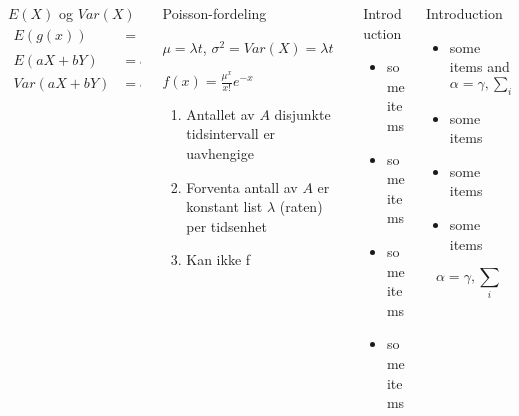 \documentclass[final,hyperref={pdfpagelabels=false}]{beamer}
\begin{document}
\begin{frame}{}
\begin{columns}[t]
\begin{column}{.25\linewidth}
\begin{block}{\normalsize $E(X)$ og $Var(X)$}
{\begin{equation*}
\begin{aligned}
						E(g(x))&=\int_{-\infty}^\infty g(X)f(x)\,dx \\
						E(aX+bY)&=aE(X)+bE(Y) \\
						Var(aX+bY)&=a^2Var(X)+b^2Var(Y)
					\end{aligned}
				\end{equation*}
			}
        \end{block}
      \end{column}
	  \begin{column}{.25\linewidth}
		  \begin{block}{\normalsize Poisson-fordeling}
			  {\footnotesize
				$\mu = \lambda t$, $\sigma^2=Var(X)=\lambda t$\par
				$f(x)=\frac{\mu^x}{x!}e^{-x}$\par
				\begin{enumerate}
					\item Antallet av $A$ disjunkte tidsintervall er uavhengige
					\item Forventa antall av $A$ er konstant list $\lambda$ (raten) per tidsenhet
					\item Kan ikke f
				\end{enumerate}
			  }
		\end{block}
      \end{column}
	  \begin{column}{.25\linewidth}
		  \begin{block}{Introduction}
          \begin{itemize}
          \item some items
          \item some items
          \item some items
          \item some items
          \end{itemize}
        \end{block}
      \end{column}
	  \begin{column}{.25\linewidth}
        \begin{block}{Introduction}
          \begin{itemize}
          \item some items and $\alpha=\gamma, \sum_{i}$
          \item some items
          \item some items
          \item some items
          \end{itemize}
          $$\alpha=\gamma, \sum_{i}$$
        \end{block}


\end{column}
\end{columns}
\end{frame}
\end{document}
